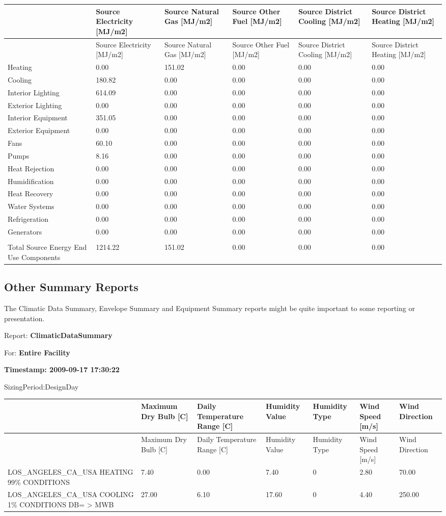 \begin{longtable}[c]{p{1.0in}p{1.0in}p{1.0in}p{1.0in}p{1.0in}p{1.0in}}
\toprule 
 & Source Electricity [MJ/m2] & Source Natural Gas [MJ/m2] & Source Other Fuel [MJ/m2] & Source District Cooling [MJ/m2] & Source District Heating [MJ/m2] \tabularnewline
\midrule
\endfirsthead

\toprule 
 & Source Electricity [MJ/m2] & Source Natural Gas [MJ/m2] & Source Other Fuel [MJ/m2] & Source District Cooling [MJ/m2] & Source District Heating [MJ/m2] \tabularnewline
\midrule
\endhead

Heating & 0.00 & 151.02 & 0.00 & 0.00 & 0.00 \tabularnewline
Cooling & 180.82 & 0.00 & 0.00 & 0.00 & 0.00 \tabularnewline
Interior Lighting & 614.09 & 0.00 & 0.00 & 0.00 & 0.00 \tabularnewline
Exterior Lighting & 0.00 & 0.00 & 0.00 & 0.00 & 0.00 \tabularnewline
Interior Equipment & 351.05 & 0.00 & 0.00 & 0.00 & 0.00 \tabularnewline
Exterior Equipment & 0.00 & 0.00 & 0.00 & 0.00 & 0.00 \tabularnewline
Fans & 60.10 & 0.00 & 0.00 & 0.00 & 0.00 \tabularnewline
Pumps & 8.16 & 0.00 & 0.00 & 0.00 & 0.00 \tabularnewline
Heat Rejection & 0.00 & 0.00 & 0.00 & 0.00 & 0.00 \tabularnewline
Humidification & 0.00 & 0.00 & 0.00 & 0.00 & 0.00 \tabularnewline
Heat Recovery & 0.00 & 0.00 & 0.00 & 0.00 & 0.00 \tabularnewline
Water Systems & 0.00 & 0.00 & 0.00 & 0.00 & 0.00 \tabularnewline
Refrigeration & 0.00 & 0.00 & 0.00 & 0.00 & 0.00 \tabularnewline
Generators & 0.00 & 0.00 & 0.00 & 0.00 & 0.00 \tabularnewline
 &  &  &  &  &  \tabularnewline
Total Source Energy End Use Components & 1214.22 & 151.02 & 0.00 & 0.00 & 0.00 \tabularnewline
\bottomrule
\end{longtable}

\subsection{Other Summary Reports}\label{other-summary-reports}

The Climatic Data Summary, Envelope Summary and Equipment Summary reports might be quite important to some reporting or presentation.

Report: \textbf{ClimaticDataSummary}

For: \textbf{Entire Facility}

\textbf{Timestamp: 2009-09-17 17:30:22}

SizingPeriod:DesignDay

\begin{longtable}[c]{p{0.85in}p{0.85in}p{0.85in}p{0.85in}p{0.85in}p{0.85in}p{0.85in}}
\toprule 
~ & Maximum Dry Bulb [C] & Daily Temperature Range [C] & Humidity Value & Humidity Type & Wind Speed [m/s] & Wind Direction \tabularnewline
\midrule
\endfirsthead

\toprule 
~ & Maximum Dry Bulb [C] & Daily Temperature Range [C] & Humidity Value & Humidity Type & Wind Speed [m/s] & Wind Direction \tabularnewline
\midrule
\endhead

LOS\_ANGELES\_CA\_USA HEATING 99\% CONDITIONS & 7.40 & 0.00 & 7.40 & 0 & 2.80 & 70.00 \tabularnewline
LOS\_ANGELES\_CA\_USA COOLING 1\% CONDITIONS DB= > MWB & 27.00 & 6.10 & 17.60 & 0 & 4.40 & 250.00 \tabularnewline
\bottomrule
\end{longtable}

